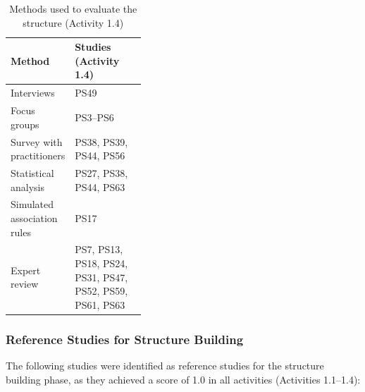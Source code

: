 \begin{table}[t]
\caption{Methods used to evaluate the structure (Activity 1.4)}
\label{tab:app_methods_structure_evaluation}
\centering
\small
\setlength{\tabcolsep}{4pt}
\renewcommand{\arraystretch}{1.15}
\begin{tabularx}{\linewidth}{@{}>{\raggedright\arraybackslash}p{0.38\linewidth}
                            >{\raggedright\arraybackslash}X@{}}
\toprule
\textbf{Method} & \textbf{Studies (Activity 1.4)} \\
\midrule
Interviews & PS49 \\
Focus groups & PS3--PS6 \\
Survey with practitioners & PS38, PS39, PS44, PS56 \\
Statistical analysis & PS27, PS38, PS44, PS63 \\
Simulated association rules & PS17 \\
Expert review & PS7, PS13, PS18, PS24, PS31, PS47, PS52, PS59, PS61, PS63 \\
\bottomrule
\end{tabularx}
\end{table}

\subsubsection{Reference Studies for Structure Building}

The following studies were identified as reference studies for the structure building phase, as they achieved a score of 1.0 in all activities (Activities 1.1--1.4):

